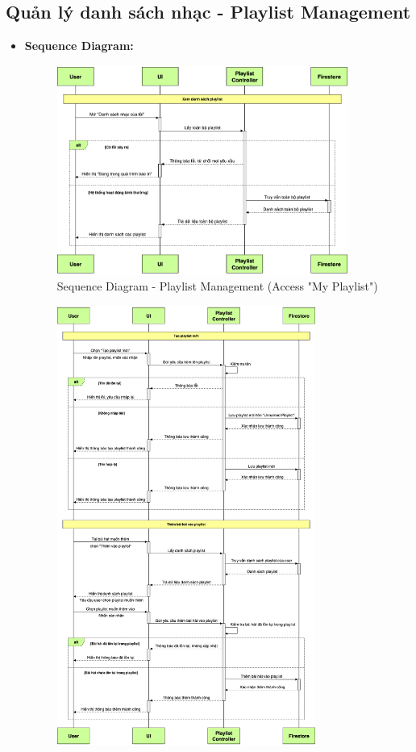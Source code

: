 \documentclass[a4paper]{article}
\begin{document}
\subsection{Quản lý danh sách nhạc - Playlist Management}
\begin{itemize}
	\item \textbf{Sequence Diagram:}
	      \begin{figure}[H]
		      \centering
		      \includegraphics[width=0.9\textwidth]{Images/playlist/playlist-1_sd.png}
		      \caption{Sequence Diagram - Playlist Management (Access "My Playlist")}
	      \end{figure}
        \begin{figure}[H]
		      \centering
		      \includegraphics[width=0.8\textwidth]{Images/playlist/playlist-3ab_sd.png}

\end{figure}
\end{itemize}
\end{document}
